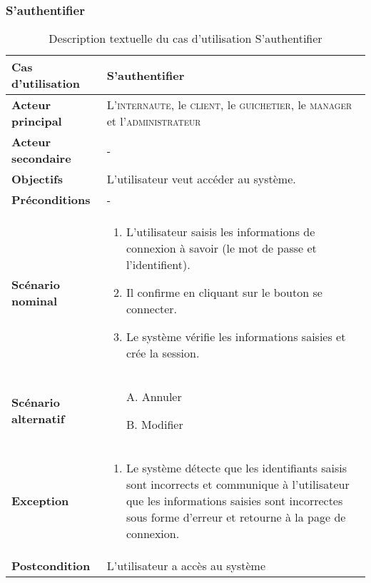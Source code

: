         \subsubsection[S’authentifier]{S’authentifier}
            \begin{longtable}{p{4cm} p{9cm}}
                \caption{Description textuelle du cas d’utilisation S’authentifier}
                \label{table:usecaseSauth}
                \\\hline\hline
                    \textbf{Cas d’utilisation} & \textbf{S’authentifier}
                \\\hline\hline
                        \textbf{Acteur principal} & L’\textsc{internaute}, le \textsc{client},
                        le \textsc{guichetier}, le \textsc{manager} et l’\textsc{administrateur}
                    \\
                        \textbf{Acteur secondaire} & -
                    \\
                        \textbf{Objectifs} & L’utilisateur veut accéder au système.
                    \\
                        \textbf{Préconditions} & -
                    \\
                    \textbf{Scénario nominal} &
                        \begin{enumerate}[leftmargin=*]
                            \item L’utilisateur saisis les informations de connexion à savoir (le mot de
                            passe et l’identifient).
                            \item Il confirme en cliquant sur le bouton se connecter.
                            \item Le système vérifie les informations saisies et crée la session.
                        \end{enumerate}
                    \\
                    \textbf{Scénario alternatif} &
                    \begin{enumerate}[leftmargin=*]
                            \item [A.] Annuler
                            \item [B.] Modifier
                        \end{enumerate}
                    \\
                    \textbf{Exception} &
                    \begin{enumerate}[leftmargin=*]
                            \item Le système détecte que les identifiants saisis sont incorrects et communique à
                            l’utilisateur que les informations saisies sont incorrectes sous forme d’erreur et
                            retourne à la page de connexion.
                        \end{enumerate}
                    \\
                    \textbf{Postcondition} & L’utilisateur a accès au système
                \\\bottomrule
            \end{longtable}

